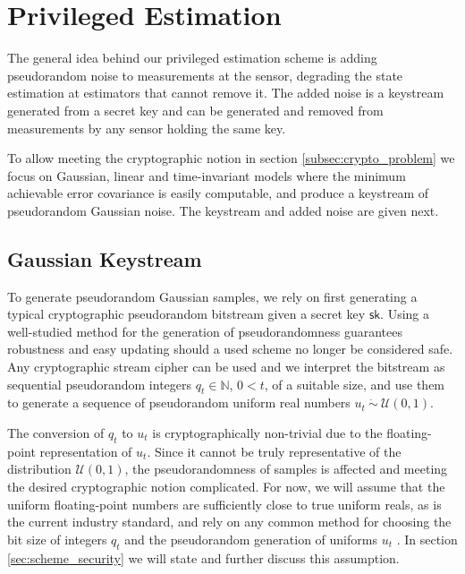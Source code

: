 \documentclass[letterpaper, 10 pt, conference]{IEEEtran}
\theoremstyle{definition}
\theoremstyle{definition}
\theoremstyle{remark}
\begin{document}
\section{Privileged Estimation}\label{sec:priv_estimation}

The general idea behind our privileged estimation scheme is adding pseudorandom noise to measurements at the sensor, degrading the state estimation at estimators that cannot remove it. The added noise is a keystream generated from a secret key and can be generated and removed from measurements by any sensor holding the same key.

To allow meeting the cryptographic notion in section \ref{subsec:crypto_problem} we focus on Gaussian, linear and time-invariant models where the minimum achievable error covariance is easily computable, and produce a keystream of pseudorandom Gaussian noise. The keystream and added noise are given next.

% 
% 

\subsection{Gaussian Keystream}\label{subsec:gaussian_keystream}
To generate pseudorandom Gaussian samples, we rely on first generating a typical cryptographic pseudorandom bitstream given a secret key $\mathsf{sk}$. Using a well-studied method for the generation of pseudorandomness guarantees robustness and easy updating should a used scheme no longer be considered safe. Any cryptographic stream cipher can be used and we interpret the bitstream as sequential pseudorandom integers $q_t \in \mathbb{N}$, $0<t$, of a suitable size, and use them to generate a sequence of pseudorandom uniform real numbers $u_t\ \dot{\sim}\ \mathcal{U}(0,1)$.

The conversion of $q_t$ to $u_t$ is cryptographically non-trivial due to the floating-point representation of $u_t$. Since it cannot be truly representative of the distribution $\mathcal{U}(0,1)$, the pseudorandomness of samples is affected and meeting the desired cryptographic notion complicated. For now, we will assume that the uniform floating-point numbers are sufficiently close to true uniform reals, as is the current industry standard, and rely on any common method for choosing the bit size of integers $q_t$ and the pseudorandom generation of uniforms $u_t$ \cite{goualardGeneratingRandomFloatingPoint2020}. In section \ref{sec:scheme_security} we will state and further discuss this assumption.
\end{document}

